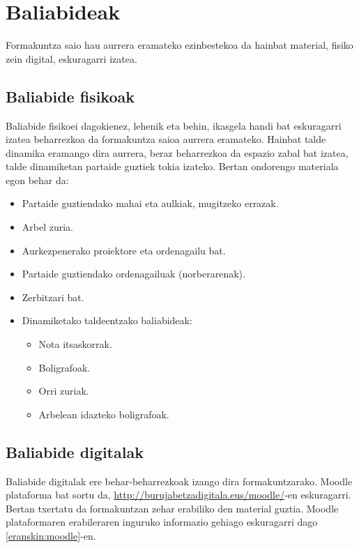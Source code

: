 \section{Baliabideak}

Formakuntza saio hau aurrera eramateko ezinbestekoa da hainbat material, fisiko zein digital, eskuragarri izatea.

\subsection{Baliabide fisikoak}

Baliabide fisikoei dagokienez, lehenik eta behin, ikasgela handi bat eskuragarri izatea beharrezkoa da formakuntza saioa aurrera eramateko. Hainbat talde dinamika eramango dira aurrera, beraz beharrezkoa da espazio zabal bat izatea, talde dinamiketan partaide guztiek tokia izateko. Bertan ondorengo materiala egon behar da:

\begin{itemize}
    \item Partaide guztiendako mahai eta aulkiak, mugitzeko errazak.
    \item Arbel zuria.
    \item Aurkezpenerako proiektore eta ordenagailu bat.
    \item Partaide guztiendako ordenagailuak (norberarenak).
    \item Zerbitzari bat.
    \item Dinamiketako taldeentzako baliabideak:
    \begin{itemize}
        \item Nota itsaskorrak.
        \item Boligrafoak.
        \item Orri zuriak.
        \item Arbelean idazteko boligrafoak.
    \end{itemize}
\end{itemize}

\subsection{Baliabide digitalak}

Baliabide digitalak ere behar-beharrezkoak izango dira formakuntzarako. Moodle plataforma bat sortu da, \url{http://burujabetzadigitala.eus/moodle/}-en eskuragarri. Bertan txertatu da formakuntzan zehar erabiliko den material guztia. Moodle plataformaren erabileraren inguruko informazio gehiago eskuragarri dago \ref{eranskin:moodle}-en.

